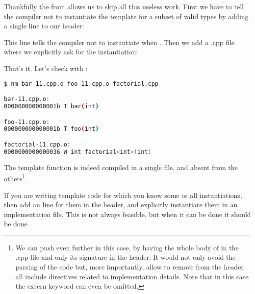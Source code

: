 \bigskip

Thankfully the  from  allows us to skip
all this useless work. First we have to tell the compiler not to
instantiate the template for a subset of valid types by adding a
single line to our header:


This line tells the compiler not to instantiate
 when . Then we add a .cpp file
where we explicitly ask for the instantiation:



That's it. Let's check with :

\begin{lstlisting}[language=bash]
$ nm bar-11.cpp.o foo-11.cpp.o factorial.cpp

bar-11.cpp.o:
000000000000001b T bar(int)

foo-11.cpp.o:
000000000000001b T foo(int)

factorial-11.cpp.o:
0000000000000036 W int factorial<int>(int)
\end{lstlisting}

The template function is indeed compiled in a single file, and absent
from the others\footnote{We can push even further in this case, by
having the whole body of  in the .cpp file and only
its signature in the header. It would not only avoid the parsing of
the code but, more importantly, allow to remove from the header all
include directives related to implementation details. Note that in
this case the extern keyword can even be omitted.}.

\begin{guideline}
If you are writing template code for which you know some or all
instantiations, then add an  line for them in
the header, and explicitly instantiate them in an implementation file.
This is not always feasible, but when it can be done it should be done
\end{guideline}
